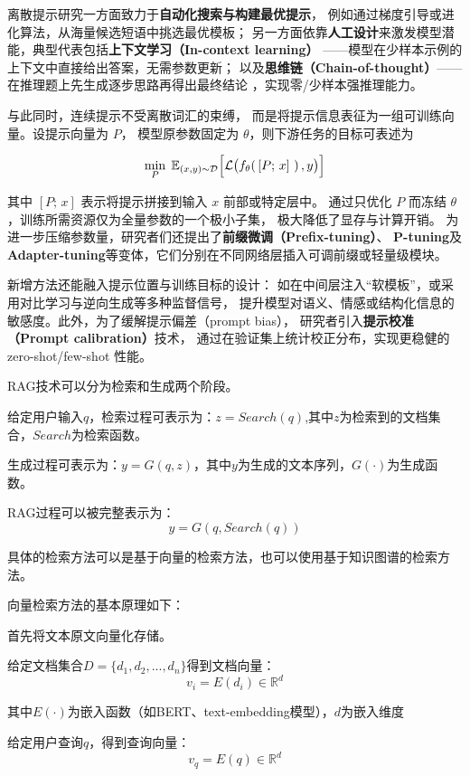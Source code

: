 \documentclass{xmu}
\begin{document}
离散提示研究一方面致力于{\bf 自动化搜索与构建最优提示}，
例如通过梯度引导或进化算法，从海量候选短语中挑选最优模板；
另一方面依靠{\bf 人工设计}来激发模型潜能，典型代表包括{\bf 上下文学习（In-context learning）}
——模型在少样本示例的上下文中直接给出答案，无需参数更新；
以及{\bf 思维链（Chain-of-thought）}——在推理题上先生成逐步思路再得出最终结论
，实现零/少样本强推理能力。

与此同时，连续提示不受离散词汇的束缚，
而是将提示信息表征为一组可训练向量。设提示向量为 $P$，
模型原参数固定为 $\theta$，则下游任务的目标可表述为

$$
\min_{P}\;\mathbb{E}_{(x,y)\sim \mathcal{D}}\Bigl[\mathcal{L}\bigl(f_{\theta}(\,[P;\,x]\ )\,,y\bigr)\Bigr]
$$

其中 $[P;\,x]$ 表示将提示拼接到输入 $x$ 前部或特定层中。
通过只优化 $P$ 而冻结 $\theta$，训练所需资源仅为全量参数的一个极小子集，
极大降低了显存与计算开销。
为进一步压缩参数量，研究者们还提出了{\bf 前缀微调（Prefix-tuning）}、
{\bf P-tuning}及{\bf Adapter-tuning}等变体，它们分别在不同网络层插入可调前缀或轻量级模块。

新增方法还能融入提示位置与训练目标的设计：
如在中间层注入“软模板”，或采用对比学习与逆向生成等多种监督信号，
提升模型对语义、情感或结构化信息的敏感度。此外，为了缓解提示偏差（prompt bias），
研究者引入{\bf 提示校准（Prompt calibration）}技术，
通过在验证集上统计校正分布，实现更稳健的 zero-shot/few-shot 性能。

RAG技术可以分为检索和生成两个阶段。

给定用户输入$q$，检索过程可表示为：$z = Search(q)$,其中$z$为检索到的文档集合，$Search$为检索函数。

生成过程可表示为：$y = G(q,z)$，其中$y$为生成的文本序列，$G(·)$为生成函数。

RAG过程可以被完整表示为：
$$
y = G(q,Search(q))
$$

具体的检索方法可以是基于向量的检索方法，也可以使用基于知识图谱的检索方法。

向量检索方法的基本原理如下：

首先将文本原文向量化存储。

给定文档集合$D=\{d_1,d_2,...,d_n\}$得到文档向量：
$$
v_i = E(d_i) \in \mathbb{R}^d
$$

其中$E(·)$为嵌入函数（如BERT、text-embedding模型），$d$为嵌入维度

给定用户查询$q$，得到查询向量：
$$
v_q = E(q) \in \mathbb{R}^d
$$
\end{document}
